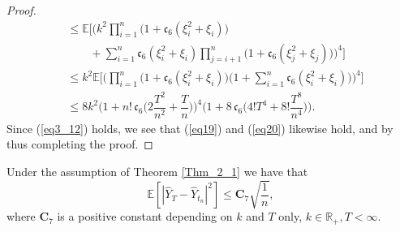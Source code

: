 \begin{proof}
\begin{align}
        &\leq \mathbb{E} \Bigg[ \bigg(k^2 \prod_{i=1}^n \big(1 + \mathfrak{c}_6(\xi_i^2 + \xi_i)\big) \nonumber \\ 
        &\qquad + \sum_{i=1}^n \mathfrak{c}_6(\xi_i^2 + \xi_i) \prod_{j=i+1}^n \big(1 + \mathfrak{c}_6(\xi_j^2 + \xi_j)\big)\bigg)^4 \Bigg] \\
        &\leq k^2 \mathbb{E}\Bigg[ \bigg( \prod_{i=1}^n \big(1 + \mathfrak{c}_6(\xi_i^2 + \xi_i)\big)\big(1 +  \sum_{i=1}^n \mathfrak{c}_6(\xi_i^2 + \xi_i) \big) \bigg)^4 \Bigg]\nonumber \\
         &\leq 8 k^2  \bigg( 1 + n! \,  \mathfrak{c}_6 \bigg(2\dfrac{T^2}{n^2} + \dfrac{T}{n}\bigg)\bigg)^4\bigg(1 + 8 \, \mathfrak{c}_6 \bigg(4!T^4 + 8!\dfrac{T^8}{n^4}\bigg) \bigg).  \nonumber
    \end{align}
Since (\ref{eq3_12}) holds, we see that (\ref{eq19}) and (\ref{eq20}) likewise hold, and by thus completing the proof.
\end{proof}
\begin{proposition}\label{prop3_5}
Under the assumption of Theorem \ref{Thm_2_1} we have that 
\begin{equation*}
    \mathbb{E} [|\hat{Y}_{T} - \hat{Y}_{t_{n}}|^2] \leq \mathbf{C}_7\sqrt{\dfrac{1}{n}},
\end{equation*}
where $\mathbf{C}_7 $ is a positive constant depending on $k$ and $T$ only, $ k \in \mathbb{R}_+, T < \infty$.
\end{proposition}
